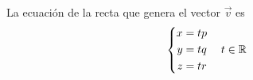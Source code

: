 \documentclass[a5paper,12pt,twoside]{book}
\begin{document}

\begin{center}
    \def\svgwidth{0.8\linewidth}
    
\end{center}

La ecuación de la recta que genera el vector $\vec{v}$ es
\[ \left\{
  \begin{aligned}
    x &= t p
    \\
    y &= t q
    \\
    z &= t r
  \end{aligned}
\right. \quad t \in \mathbb{R} \]
\end{document}
